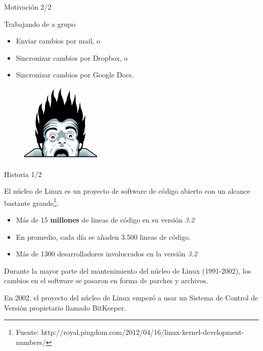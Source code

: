 \documentclass{beamer}
\begin{document}
\begin{frame}{Motivación 2/2}

    \begin{block}{Trabajando de a grupo}
        \begin{itemize}
            \item Enviar cambios por mail, o
            \pause
            \item Sincronizar cambios por Dropbox, o
            \pause
            \item Sincronizar cambios por Google Docs.
        \end{itemize}
    \end{block}

    \pause
    \begin{figure}[ht]
        \begin{center}
            \includegraphics[height=1.5in]{images/horror.png}
        \end{center}
    \end{figure}

\end{frame}

\begin{frame}{Historia 1/2}

    El núcleo de Linux es un proyecto de software de código abierto con un alcance bastante grande\footnote{Fuente: http://royal.pingdom.com/2012/04/16/linux-kernel-development-numbers/}:
    \begin{itemize}
        \item Más de 15 \textbf{millones} de lineas de código en su versión \textit{3.2}
        \item En promedio, cada día se añaden 3.500 lineas de código.
        \item Más de 1300 desarrolladores involucrados en la versión \textit{3.2}
    \end{itemize}

    \vspace{0.5em}

    Durante la mayor parte del mantenimiento del núcleo de Linux (1991-2002), los cambios en el software se pasaron en forma de parches y archivos.

    \vspace{0.5em}

    En 2002, el proyecto del núcleo de Linux empezó a usar un Sistema de Control de Versión propietario llamado BitKeeper.

\end{frame}
\end{document}
